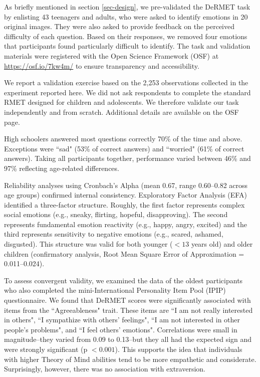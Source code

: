 \documentclass[11pt]{article}
\begin{document}
{\par \medskip

As briefly mentioned in section \ref{sec-design}, we pre-validated the DeRMET task by enlisting 43 teenagers and adults, who were asked to identify emotions in 20 original images. They were also asked to provide feedback on the perceived difficulty of each question. Based on their responses, we removed four emotions that participants found particularly difficult to identify. The task and validation materials were registered with the Open Science Framework (OSF) at \href{https://osf.io/7kw4m/}{https://osf.io/7kw4m/} to ensure transparency and accessibility.

We report a validation exercise based on the 2,253 observations collected in the experiment reported here. We did not ask respondents to complete the standard RMET designed for children and adolescents. We therefore validate our task independently and from scratch. Additional details are available on the OSF page.

High schoolers answered most questions correctly 70\% of the time and above. Exceptions were ``sad" (53\% of correct answers) and ``worried" (61\% of correct answers). Taking all participants together, performance varied between 46\% and 97\% reflecting age-related differences.

Reliability analyses using Cronbach's Alpha (mean 0.67, range 0.60–0.82 across age groups) confirmed internal consistency. Exploratory Factor Analysis (EFA) identified a three-factor structure. Roughly, the first factor represents complex social emotions (e.g., sneaky, flirting, hopeful, disapproving). The second represents fundamental emotion reactivity (e.g., happy, angry, excited) and the third represents sensitivity to negative emotions  (e.g., scared, ashamed, disgusted). This structure was valid for both younger ($<13$ years old) and older children (confirmatory analysis, Root Mean Square Error of Approximation = 0.011–0.024). 

To assess convergent validity, we examined the data of the oldest participants who also completed the  mini-International Personality Item Pool (IPIP) questionnaire. We found that DeRMET scores were significantly associated with items from the ``Agreeableness" trait. These items are ``I am not really interested in others", ``I sympathize with others' feelings", ``I am not interested in other people's problems", and ``I feel others' emotions".  Correlations were small in magnitude--they varied from 0.09 to 0.13--but they all had the expected sign and were strongly significant (p $<0.001$). This supports the idea that individuals with higher Theory of Mind abilities tend to be more empathetic and considerate. Surprisingly, however, there was no association with extraversion.

}
\end{document}

